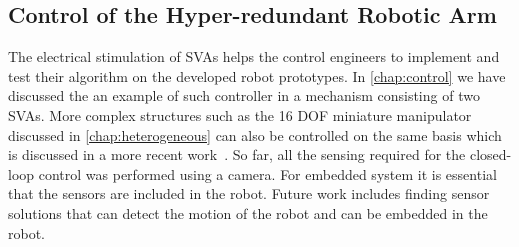 \subsection{Control of the Hyper-redundant Robotic Arm}
The electrical stimulation of SVAs helps the control engineers to implement and test their algorithm on the developed robot prototypes. In \ref{chap:control} we have discussed the an example of such controller in a mechanism consisting of two SVAs. More complex structures such as the 16 DOF miniature manipulator discussed in \ref{chap:heterogeneous} can also be controlled on the same basis which is discussed in a more recent work~\cite{Doroudchi2020}. 
So far, all the sensing required for the closed-loop control was performed using a camera. For embedded system it is essential that the sensors are included in the robot. Future work includes finding sensor solutions that can detect the motion of the robot and can be embedded in the robot. 


